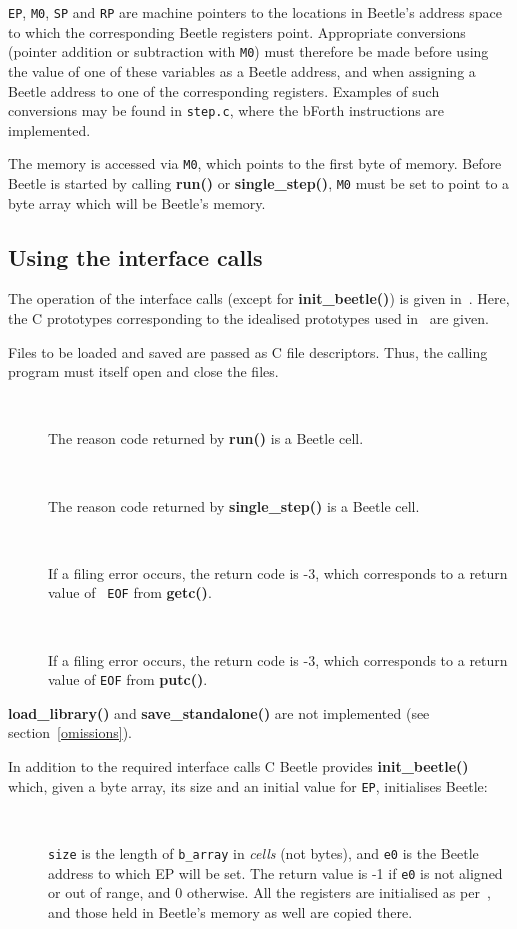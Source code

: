 \documentclass{article}
\newlength{\ifacewidth}\ifacewidth=\textwidth \advance\ifacewidth by -0.1in
\newlength{\innerwidth}\innerwidth=\ifacewidth \advance\innerwidth by -0.5in
\newcommand{\ifacec}[2]{\item[]\parbox{\ifacewidth}{\hspace*{2.5mm}{\tt #1}\\[0.5ex]\hspace*{0.4in}\parbox{\innerwidth}{#2}}}
\begin{document}
{\tt EP}, {\tt M0}, {\tt SP} and {\tt RP} are machine pointers to the
locations in Beetle's address space to which the corresponding Beetle
registers point. Appropriate conversions (pointer addition or subtraction
with {\tt M0}) must therefore be made before using the value of one of these
variables as a Beetle address, and when assigning a Beetle address to one of
the corresponding registers. Examples of such conversions may be found in
{\tt step.c}, where the bForth instructions are implemented.

The memory is accessed via {\tt M0}, which points to the first byte of
memory. Before Beetle is started by calling {\bf run()} or {\bf
single\_step()}, {\tt M0} must be set to point to a byte array which will be
Beetle's memory.


\subsection{Using the interface calls}
\label{usingcalls}

The operation of the interface calls (except for {\bf init\_beetle()}) is
given in~\cite{beetle}. Here, the C prototypes corresponding to the idealised
prototypes used in~\cite{beetle} are given.

Files to be loaded and saved are passed as C file descriptors. Thus, the
calling program must itself open and close the files.

\begin{description}
\ifacec{CELL run()}{The reason code returned by {\bf run()} is a Beetle
cell.}
\ifacec{CELL single\_step()}{The reason code returned by {\bf single\_step()}
is a Beetle cell.}
\ifacec{int load\_object(FILE *file, CELL *address)}{If a filing error
occurs, the return code is -3, which corresponds to a return value of {\tt
EOF} from {\bf getc()}.}
\ifacec{int save\_object(FILE *file, CELL *address, UCELL length)}{If a
filing error occurs, the return code is -3, which corresponds to a return
value of {\tt EOF} from {\bf putc()}.}
\end{description}

{\bf load\_library()} and {\bf save\_standalone()} are not implemented (see
section~\ref{omissions}).

In addition to the required interface calls C Beetle provides {\bf
init\_beetle()} which, given a byte array, its size and an initial value for
{\tt EP}, initialises Beetle:

\begin{description}
\ifacec{int init\_beetle(BYTE *b\_array, long size, UCELL e0)}{{\tt size} is
the length of {\tt b\_array} in {\em cells} (not bytes), and {\tt e0} is the
Beetle address to which EP will be set. The return value is -1 if {\tt e0} is
not aligned or out of range, and 0 otherwise. All the registers are
initialised as per~\cite{beetle}, and those held in Beetle's memory as well
are copied there.}
\end{description}
\end{document}
